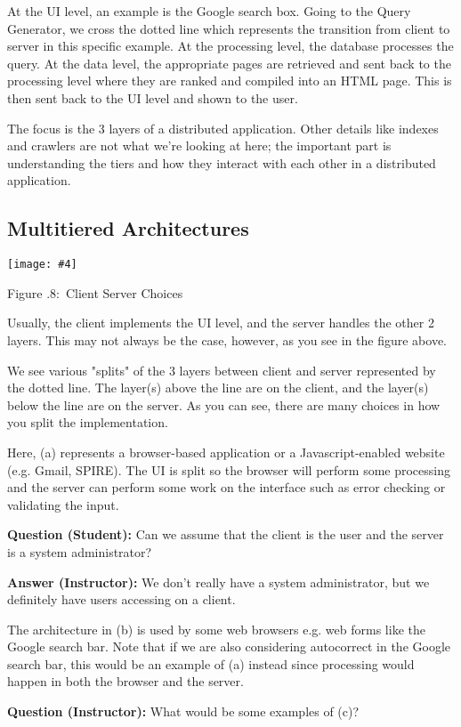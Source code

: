 \documentclass[twoside]{article}
\newcounter{lecnum}
\newcommand{\fig}[4]{
            \centerline{\texttt{[image: \#4]}}
            \begin{center}
            Figure \thelecnum.#1:~#3
            \end{center}
    }
\begin{document}
At the UI level, an example is the Google search box. Going to the Query Generator, we cross the dotted line which represents the transition from client to server in this specific example. At the processing level, the database processes the query. At the data level, the appropriate pages are retrieved and sent back to the processing level where they are ranked and compiled into an HTML page. This is then sent back to the UI level and shown to the user.

The focus is the 3 layers of a distributed application. Other details like indexes and crawlers are not what we're looking at here; the important part is understanding the tiers and how they interact with each other in a distributed application.


\subsection{Multitiered Architectures}
\fig{8}{0.3}{Client Server Choices}{choices.png}

Usually, the client implements the UI level, and the server handles the other 2 layers. This may not always be the case, however, as you see in the figure above.

We see various "splits" of the 3 layers between client and server represented by the dotted line. The layer(s) above the line are on the client, and the layer(s) below the line are on the server. As you can see, there are many choices in how you split the implementation.

Here, (a) represents a browser-based application or a Javascript-enabled website (e.g. Gmail, SPIRE). The UI is split so the browser will perform some processing and the server can perform some work on the interface such as error checking or validating the input.  

\textbf{Question (Student): } Can we assume that the client is the user and the server is a system administrator?

\textbf{Answer (Instructor): } We don't really have a system administrator, but we definitely have users accessing on a client.

The architecture in (b) is used by some web browsers e.g. web forms like the Google search bar. Note that if we are also considering autocorrect in the Google search bar, this would be an example of (a) instead since processing would happen in both the browser and the server.

\textbf{Question (Instructor): } What would be some examples of (c)?
\end{document}
